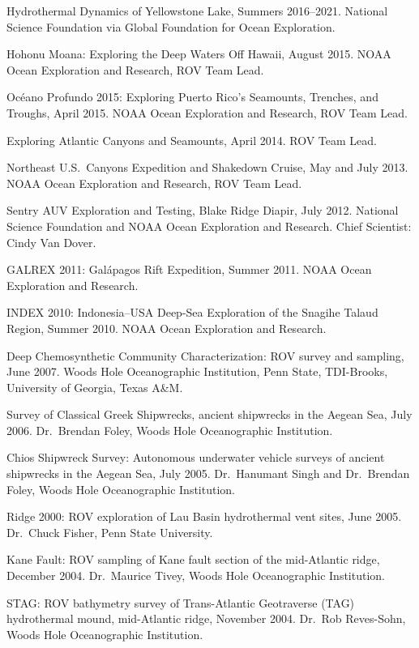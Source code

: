\begin{cvenum}
  \item Hydrothermal Dynamics of Yellowstone Lake, Summers 2016--2021. National Science Foundation via Global Foundation for Ocean Exploration.
  \item Hohonu Moana: Exploring the Deep Waters Off Hawaii, August 2015. NOAA Ocean Exploration and Research, ROV Team Lead.
  \item Océano Profundo 2015: Exploring Puerto Rico's Seamounts, Trenches, and Troughs, April 2015. NOAA Ocean Exploration and Research, ROV Team Lead.
  \item Exploring Atlantic Canyons and Seamounts, April 2014. ROV Team Lead.
  \item Northeast U.S.\ Canyons Expedition and Shakedown Cruise, May and July 2013. NOAA Ocean Exploration and Research, ROV Team Lead.
  \item Sentry AUV Exploration and Testing, Blake Ridge Diapir, July 2012. National Science Foundation and NOAA Ocean Exploration and Research. Chief Scientist: Cindy Van Dover.
  \item GALREX 2011: Galápagos Rift Expedition, Summer 2011. NOAA Ocean Exploration and Research.
  \item INDEX 2010: Indonesia--USA Deep-Sea Exploration of the Snagihe Talaud Region, Summer 2010. NOAA Ocean Exploration and Research.
  \item Deep Chemosynthetic Community Characterization: ROV survey and sampling, June 2007. Woods Hole Oceanographic Institution, Penn State, TDI-Brooks, University of Georgia, Texas A\&M.
  \item Survey of Classical Greek Shipwrecks, ancient shipwrecks in the Aegean Sea, July 2006. Dr.\ Brendan Foley, Woods Hole Oceanographic Institution.
  \item Chios Shipwreck Survey: Autonomous underwater vehicle surveys of ancient shipwrecks in the Aegean Sea, July 2005. Dr.\ Hanumant Singh and Dr.\ Brendan Foley, Woods Hole Oceanographic Institution.
  \item Ridge 2000: ROV exploration of Lau Basin hydrothermal vent sites, June 2005. Dr.\ Chuck Fisher, Penn State University.
  \item Kane Fault: ROV sampling of Kane fault section of the mid-Atlantic ridge, December 2004. Dr.\ Maurice Tivey, Woods Hole Oceanographic Institution.
  \item STAG: ROV bathymetry survey of Trans-Atlantic Geotraverse (TAG) hydrothermal mound, mid-Atlantic ridge, November 2004. Dr.\ Rob Reves-Sohn, Woods Hole Oceanographic Institution.

\end{cvenum}
